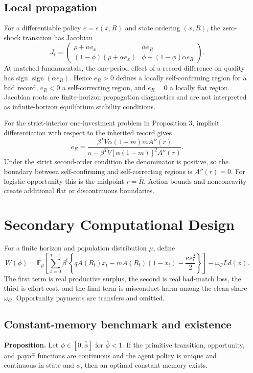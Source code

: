 \subsection{Local propagation}

For a differentiable policy $e=e(x,R)$ and state ordering $(x,R)$, the zero-shock transition has Jacobian
\[
J_t=\begin{pmatrix}
\rho+\alpha e_x & \alpha e_R\\
(1-\phi)(\rho+\alpha e_x) & \phi+(1-\phi)\alpha e_R
\end{pmatrix}.
\]
At matched fundamentals, the one-period effect of a record difference on quality has sign $\operatorname{sign}(\alpha e_R)$. Hence $e_R>0$ defines a locally self-confirming region for a bad record, $e_R<0$ a self-correcting region, and $e_R=0$ a locally flat region. Jacobian roots are finite-horizon propagation diagnostics and are not interpreted as infinite-horizon equilibrium stability conditions.

For the strict-interior one-investment problem in Proposition 3, implicit differentiation with respect to the inherited record gives
\[
e_R=\frac{\beta^T V\alpha(1-m)m A''(r)}
{\kappa-\beta^T V[\alpha(1-m)]^2A''(r)}.
\]
Under the strict second-order condition the denominator is positive, so the boundary between self-confirming and self-correcting regions is $A''(r)=0$. For logistic opportunity this is the midpoint $r=\bar R$. Action bounds and nonconcavity create additional flat or discontinuous boundaries.

\section{Secondary Computational Design}

For a finite horizon and population distribution $\mu$, define
\[
W(\phi)=\mathbb E_\mu\left[\sum_{t=0}^{T-1}\beta^t
\left\{q A(R_t)x_t-m A(R_t)(1-x_t)-\frac{\kappa e_t^2}{2}\right\}\right]
-\omega_C L d(\phi).
\]
The first term is real productive surplus, the second is real bad-match loss, the third is effort cost, and the final term is misconduct harm among the clean share $\omega_C$. Opportunity payments are transfers and omitted.

\subsection{Constant-memory benchmark and existence}

\textbf{Proposition.} Let $\phi\in[0,\bar\phi]$ for $\bar\phi<1$. If the primitive transition, opportunity, and payoff functions are continuous and the agent policy is unique and continuous in state and $\phi$, then an optimal constant memory exists.

